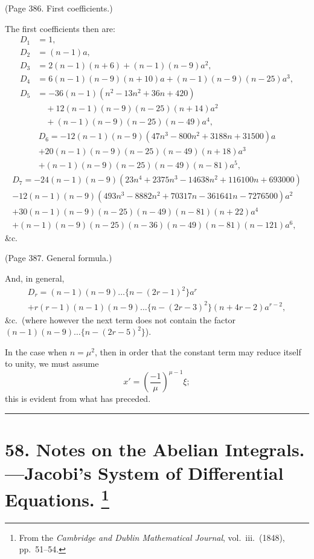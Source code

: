 \documentclass[11pt,a4paper]{article}
\theoremstyle{plain}
\theoremstyle{definition}
\begin{document}
(Page 386. First coefficients.)

The first coefficients then are:
\begin{align*}
D_1 &= 1, \\
D_2 &= (n-1)a, \\
D_3 &= 2(n-1)(n+6) + (n-1)(n-9)a^2, \\
D_4 &= 6(n-1)(n-9)(n+10)a + (n-1)(n-9)(n-25)a^3, \\
D_5 &= -36(n-1)(n^2 - 13n^2 + 36n + 420) \\
&\quad + 12(n-1)(n-9)(n-25)(n+14)a^2 \\
&\quad + (n-1)(n-9)(n-25)(n-49)a^4,
\end{align*}
\begin{multline*}
D_6 = -12(n-1)(n-9)(47n^3 - 800n^2 + 3188n + 31500)a \\
+ 20(n-1)(n-9)(n-25)(n-49)(n+18)a^3 \\
+ (n-1)(n-9)(n-25)(n-49)(n-81)a^5,
\end{multline*}
\begin{multline*}
D_7 = -24(n-1)(n-9)(23n^4 + 2375n^3 - 14638n^2 + 116100n + 693000) \\
- 12(n-1)(n-9)(493n^3 - 8882n^2 + 70317n - 361641n - 7276500)a^2 \\
+ 30(n-1)(n-9)(n-25)(n-49)(n-81)(n+22)a^4 \\
+ (n-1)(n-9)(n-25)(n-36)(n-49)(n-81)(n-121)a^6,
\end{multline*}
\&c.

(Page 387. General formula.)

And, in general,
\begin{multline*}
D_r = (n-1)(n-9)\ldots\{n - (2r-1)^2\} a^r \\
+ r(r-1)(n-1)(n-9)\ldots\{n - (2r-3)^2\}(n + 4r - 2) a^{r-2},
\end{multline*}
\&c.\ (where however the next term does not contain the factor
$(n-1)(n-9)\ldots\{n - (2r-5)^2\}$).

In the case when $n = \mu^2$, then in order that the constant term may reduce itself
to unity, we must assume
\[
x' = \left(\frac{-1}{\mu}\right)^{\mu-1} \xi;
\]
this is evident from what has preceded.

\bigskip
\hrule
\bigskip

\newpage
\section[Notes on the Abelian Integrals]{%
58. Notes on the Abelian Integrals.---Jacobi's System of Differential Equations.%
\footnote{From the \textit{Cambridge and Dublin Mathematical Journal}, vol.~iii.\ (1848), pp.~51--54.}}
\end{document}
